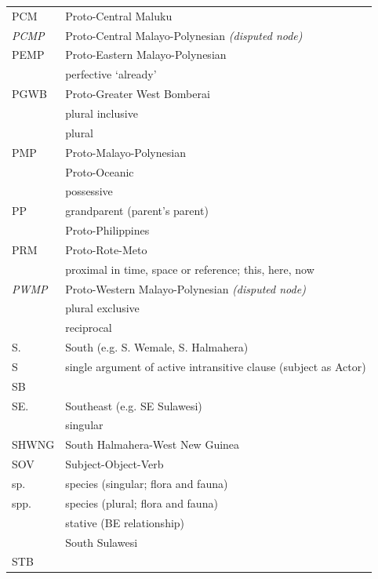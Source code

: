 {\begin{xltabular}{\textwidth}[l]{l>{\raggedright\arraybackslash}X}
PCM	&	Proto-Central Maluku	\\
\it{PCMP}	&	Proto-Central Malayo-Polynesian \it{(disputed node)}	\\
PEMP	&	Proto-Eastern Malayo-Polynesian	\\
	&	perfective ‘already’	\\
PGWB	&	Proto-Greater West Bomberai \citep{UsherSchapper2022}	\\
	&	plural inclusive	\\
	&	plural 	\\
PMP	&	Proto-Malayo-Polynesian	\\
	&	Proto-Oceanic	\\
	&	possessive	\\
PP	&	grandparent (parent's parent)	\\
	&	Proto-Philippines	\\
PRM	&	Proto-Rote-Meto \citep{Edwards2021}	\\
	&	proximal in time, space or reference; this, here, now	\\
\it{PWMP}	&	Proto-Western Malayo-Polynesian \it{(disputed node)}	\\
	&	plural exclusive	\\
	&	reciprocal	\\
S.	&	South (e.g. S. Wemale, S. Halmahera)	\\
S	&	single argument of active intransitive clause (subject as Actor)	\\
SB	&		\\
SE.	&	Southeast (e.g. SE Sulawesi)	\\
	&	singular 	\\
SHWNG	&	South Halmahera-West New Guinea	\\
SOV	&	Subject-Object-Verb	\\
sp.	&	species (singular; flora and fauna)	\\
spp.	&	species (plural; flora and fauna)	\\
	&	stative (BE relationship)	\\
	&	South Sulawesi	\\
STB	&		\\

\end{xltabular}}
